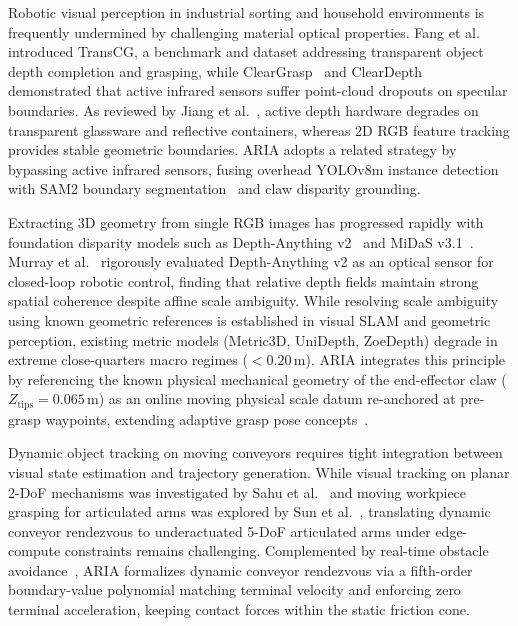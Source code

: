 \documentclass[journal]{IEEEtran}
\begin{document}
Robotic visual perception in industrial sorting and household environments is frequently undermined by challenging material optical properties. Fang et al.~\cite{aria_131_fang_2022_transcg} introduced TransCG, a benchmark and dataset addressing transparent object depth completion and grasping, while ClearGrasp~\cite{aria_047_sajjan_2020_cleargrasp} and ClearDepth~\cite{aria_046_team_2024_cleardepth} demonstrated that active infrared sensors suffer point-cloud dropouts on specular boundaries. As reviewed by Jiang et al.~\cite{aria_113_jiang_2023_robotic}, active depth hardware degrades on transparent glassware and reflective containers, whereas 2D RGB feature tracking provides stable geometric boundaries. ARIA adopts a related strategy by bypassing active infrared sensors, fusing overhead YOLOv8m instance detection~\cite{yolov8_2023} with SAM2 boundary segmentation~\cite{aria_023_ravi_2024_sam} and claw disparity grounding.

Extracting 3D geometry from single RGB images has progressed rapidly with foundation disparity models such as Depth-Anything v2~\cite{aria_052_yang_2024_depth} and MiDaS v3.1~\cite{aria_089_birkl_2023_midas}. Murray et al.~\cite{aria_009_murray_2025_assessing} rigorously evaluated Depth-Anything v2 as an optical sensor for closed-loop robotic control, finding that relative depth fields maintain strong spatial coherence despite affine scale ambiguity. While resolving scale ambiguity using known geometric references is established in visual SLAM and geometric perception, existing metric models (Metric3D, UniDepth, ZoeDepth) degrade in extreme close-quarters macro regimes ($<0.20$\,m). ARIA integrates this principle by referencing the known physical mechanical geometry of the end-effector claw ($Z_{\text{tips}} = 0.065$\,m) as an online moving physical scale datum re-anchored at pre-grasp waypoints, extending adaptive grasp pose concepts~\cite{aria_116_authors_2025_adaptive}.

Dynamic object tracking on moving conveyors requires tight integration between visual state estimation and trajectory generation. While visual tracking on planar 2-DoF mechanisms was investigated by Sahu et al.~\cite{aria_010_sahu_2025_autonomous} and moving workpiece grasping for articulated arms was explored by Sun et al.~\cite{aria_base_sun2022moving}, translating dynamic conveyor rendezvous to underactuated 5-DoF articulated arms under edge-compute constraints remains challenging. Complemented by real-time obstacle avoidance~\cite{aria_035_fishman_2025_avoid}, ARIA formalizes dynamic conveyor rendezvous via a fifth-order boundary-value polynomial matching terminal velocity and enforcing zero terminal acceleration, keeping contact forces within the static friction cone.
\end{document}
